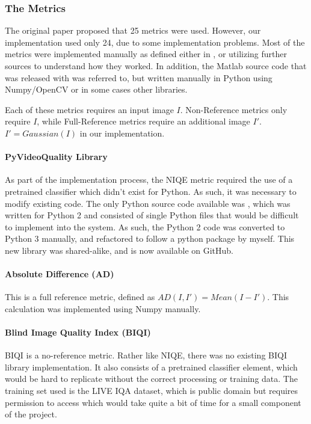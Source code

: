 \documentclass[10pt,a4paper]{article}
\begin{document}
            \subsubsection{The Metrics}
            The original paper proposed that 25 metrics were used. However, our implementation used only 24, due to some implementation problems. Most of the metrics were implemented manually as defined
            either in \cite{ImageQualityAssessmentTest}, or utilizing further sources to understand how they worked. In addition, the Matlab source code that was released with \cite{ImageQualityAssessmentTest}
            was referred to, but written manually in Python using Numpy/OpenCV or in some cases other libraries.

            Each of these metrics requires an input image $I$. Non-Reference metrics only require $I$, while Full-Reference metrics require an additional image $I'$. $I' = Gaussian(I)$ in our implementation.
            
            \paragraph{PyVideoQuality Library}
            As part of the implementation process, the NIQE metric required the use of a pretrained classifier which didn't exist for Python. As such, it was necessary to modify existing code.
            The only Python source code available was \cite{VideoQualityOriginal}, which was written for Python 2 and consisted of single Python files that would be difficult to implement into the system.
            As such, the Python 2 code was converted to Python 3 manually, and refactored to follow a python package by myself. This new library was shared-alike, and is now available on GitHub. \cite{VideoQualityUpdated}
            

            \paragraph{Absolute Difference (AD)}
                This is a full reference metric, defined as $AD(I, I') = Mean(I - I')$. This calculation was implemented using Numpy manually.

            \paragraph{Blind Image Quality Index (BIQI)}
                BIQI is a no-reference metric. Rather like NIQE, there was no existing BIQI library implementation. It also consists of a pretrained classifier element, which
                would be hard to replicate without the correct processing or training data. The training set used is the LIVE IQA dataset, which is public domain but requires 
                permission to access which would take quite a bit of time for a small component of the project.
\end{document}
